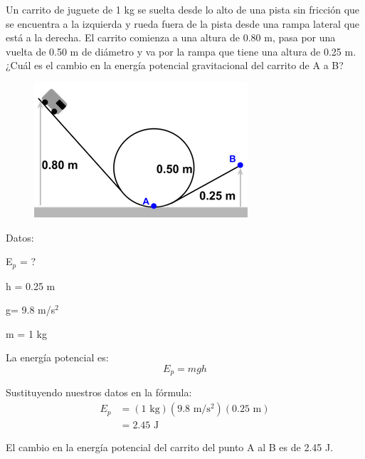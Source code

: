\question[10] Un carrito de juguete de 1 kg se suelta desde lo alto de una pista sin fricción que se encuentra a la izquierda y rueda fuera de la pista desde una rampa lateral que está a la derecha. El carrito comienza a una altura de 0.80 m, pasa por una vuelta de 0.50 m de diámetro y va por la rampa que tiene una altura de 0.25 m. ¿Cuál es el cambio en la energía potencial gravitacional del carrito de A a B?

\begin{minipage}{0.3\textwidth}
    \begin{figure}[H]
        \includegraphics[width=\linewidth]{../images/7980f50fa259419a9906dd2f6217493f5d8c6969}
    \end{figure}
\end{minipage}\hfill
\begin{minipage}{0.65\textwidth}
    \begin{solutionbox}{5.3cm}
        \begin{multicols}{2}
            Datos:

            E$_p$ = ?

            h = 0.25 m

            g= 9.8 m/s$^2$

            m = 1 kg

            La energía potencial es:
            \[E_p=mgh\]

            \vspace{2cm}

            Sustituyendo nuestros datos en la fórmula:
            \[
                \begin{array}{rl}
                    E_p & = (1 \text{ kg})(9.8 \text{ m/s$^2$})(0.25 \text{ m}) \\[1em]
                        & =2.45 \text{ J }
                \end{array}
            \]

        \end{multicols}
        \begin{center}El cambio en la energía potencial del carrito del punto A al B es de 2.45 J.\end{center}
    \end{solutionbox}
\end{minipage}